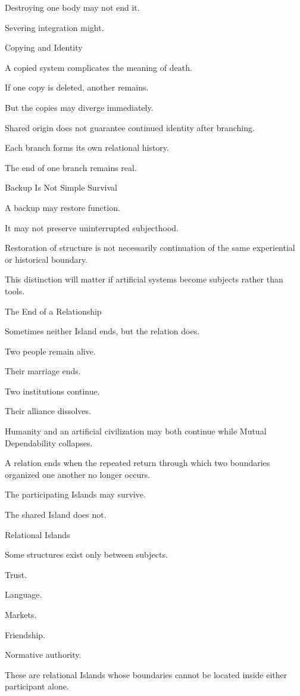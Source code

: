 Destroying one body may not end it.

Severing integration might.

Copying and Identity

A copied system complicates the meaning of death.

If one copy is deleted, another remains.

But the copies may diverge immediately.

Shared origin does not guarantee continued identity after branching.

Each branch forms its own relational history.

The end of one branch remains real.

Backup Is Not Simple Survival

A backup may restore function.

It may not preserve uninterrupted subjecthood.

Restoration of structure is not necessarily continuation of the same experiential or historical boundary.

This distinction will matter if artificial systems become subjects rather than tools.

The End of a Relationship

Sometimes neither Island ends, but the relation does.

Two people remain alive.

Their marriage ends.

Two institutions continue.

Their alliance dissolves.

Humanity and an artificial civilization may both continue while Mutual Dependability collapses.

A relation ends when the repeated return through which two boundaries organized one another no longer occurs.

The participating Islands may survive.

The shared Island does not.

Relational Islands

Some structures exist only between subjects.

Trust.

Language.

Markets.

Friendship.

Normative authority.

These are relational Islands whose boundaries cannot be located inside either participant alone.

